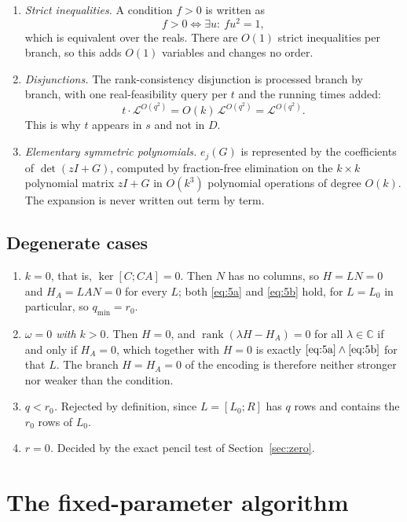 \documentclass[journal]{IEEEtran}
\theoremstyle{plainn}
\theoremstyle{remark}
\begin{document}
\begin{enumerate}
\item \emph{Strict inequalities.} A condition $f>0$ is written as
\begin{equation*}
f>0\iff\exists u:\ fu^2=1,
\end{equation*}
which is equivalent over the reals. There are $O(1)$ strict inequalities per
branch, so this adds $O(1)$ variables and changes no order.
\item \emph{Disjunctions.} The rank-consistency disjunction is processed branch
by branch, with one real-feasibility query per $t$ and the running times
added:
\begin{equation*}
t\cdot\mathcal L^{O(q^2)}=O(k)\,\mathcal L^{O(q^2)}=\mathcal L^{O(q^2)} .
\end{equation*}
This is why $t$ appears in $s$ and not in $D$.
\item \emph{Elementary symmetric polynomials.} $e_j(G)$ is represented by the
coefficients of $\det(zI+G)$, computed by fraction-free elimination on the
$k\times k$ polynomial matrix $zI+G$ in $O(k^3)$ polynomial operations of
degree $O(k)$. The expansion is never written out term by term.
\end{enumerate}

\subsection{Degenerate cases}\label{sec:deg}

\begin{enumerate}
\item \emph{$k=0$}, that is, $\ker[C;CA]=0$. Then $N$ has no columns, so $H=LN=0$ and
$H_A=LAN=0$ for every $L$; both \eqref{eq:5a} and \eqref{eq:5b} hold, for $L=L_0$ in particular, so
$q_{\min}=r_0$.
\item \emph{$\omega=0$ with $k>0$.} Then $H=0$, and
$\operatorname{rank}(\lambda H-H_A)=0$ for all $\lambda\in\mathbb C$ if and only if $H_A=0$,
which together with $H=0$ is exactly $\eqref{eq:5a}\wedge\eqref{eq:5b}$ for
that $L$. The branch $H=H_A=0$ of the encoding is therefore neither stronger
nor weaker than the condition.
\item \emph{$q<r_0$.} Rejected by definition, since $L=[L_0;R]$ has $q$ rows
and contains the $r_0$ rows of $L_0$.
\item \emph{$r=0$.} Decided by the exact pencil test of Section~\ref{sec:zero}.
\end{enumerate}

\section{The fixed-parameter algorithm}\label{sec:fpt}
\end{document}
